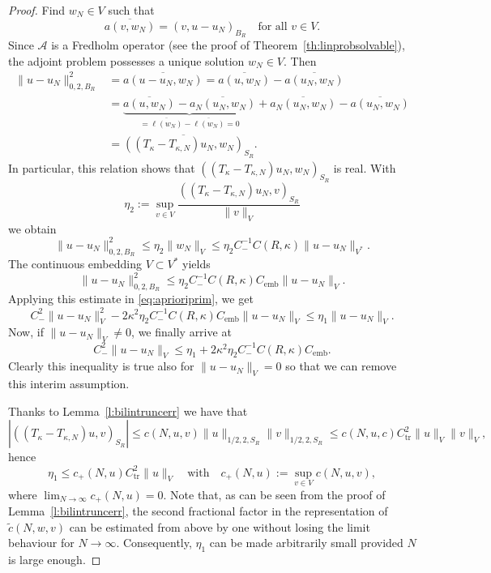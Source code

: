 \documentclass[12pt,DIV=14]{scrartcl}
\begin{document}
\begin{proof}
Find $w_N\in V$ such that
\[
\overline{a(v,w_N)} = (v,u-u_N)_{B_R}
\quad\text{for all } v\in V.
\]
Since $\mathcal{A}$ is a Fredholm operator (see the proof of Theorem~\ref{th:linprobsolvable}),
the adjoint problem possesses a unique solution $w_N\in V$.
Then
\begin{align*}
\|u-u_N\|_{0,2,B_R}^2 &= \overline{a(u-u_N,w_N)}
= \overline{a(u,w_N)} - \overline{a(u_N,w_N)}\\
&= \underbrace{\overline{a(u,w_N)} - \overline{a_N(u_N,w_N)}}_{=\overline{\ell(w_N)}-\overline{\ell(w_N)}=0}
+ \overline{a_N(u_N,w_N)} - \overline{a(u_N,w_N)}\\
&= \overline{\left((T_\kappa - T_{\kappa,N}) u_N,w_N\right)}_{S_R}.
\end{align*}
In particular, this relation shows that $\left((T_\kappa - T_{\kappa,N}) u_N,w_N\right)_{S_R}$ is real.
With
\[
\eta_2 := \sup_{v\in V}\frac{\left((T_\kappa - T_{\kappa,N}) u_N,v\right)_{S_R}}{\|v\|_V}
\]
we obtain
\[
\|u-u_N\|_{0,2,B_R}^2 \le \eta_2 \|w_N\|_V \le \eta_2 C_-^{-1}C(R,\kappa) \|u-u_N\|_{V^\ast}.
\]
The continuous embedding $V\subset V^\ast$ yields
\[
\|u-u_N\|_{0,2,B_R}^2 \le \eta_2 C_-^{-1}C(R,\kappa) C_\mathrm{emb}\|u-u_N\|_V.
\]
Applying this estimate in \eqref{eq:aprioriprim}, we get
\[
C_-^2 \|u-u_N\|_V^2 -2\kappa^2\eta_2 C_-^{-1}C(R,\kappa) C_\mathrm{emb}\|u-u_N\|_V
\le \eta_1 \|u-u_N\|_V.
\]
Now, if $\|u-u_N\|_V\ne 0$, we finally arrive at
\begin{equation}\label{eq:intermedee}
C_-^2 \|u-u_N\|_V \le \eta_1 + 2\kappa^2\eta_2 C_-^{-1}C(R,\kappa) C_\mathrm{emb}.
\end{equation}
Clearly this inequality is true also for $\|u-u_N\|_V = 0$ so that we can
remove this interim assumption.

Thanks to Lemma~\ref{l:bilintruncerr} we have that
\[
\left|\left((T_\kappa - T_{\kappa,N}) u,v\right)_{S_R}\right| \le c(N,u,v)\|u\|_{1/2,2,S_R}\|v\|_{1/2,2,S_R}
\le c(N,u,c) C_\mathrm{tr}^2 \|u\|_V\|v\|_V,
\]
hence
\begin{equation}\label{eq:eta1est}
\eta_1 \le c_+(N,u) C_\mathrm{tr}^2 \|u\|_V
\quad\text{with}\quad
c_+(N,u):=\sup_{v\in V} c(N,u,v),
\end{equation}
where $\lim_{N\to\infty}c_+(N,u) = 0$.
Note that, as can be seen from the proof of Lemma~\ref{l:bilintruncerr},
the second fractional factor in the representation of $\tilde{c}(N,w,v)$
can be estimated from above by one without losing the limit behaviour for $N\to\infty$.
Consequently, $\eta_1$ can be made arbitrarily small provided $N$ is large enough.


\end{proof}
\end{document}
